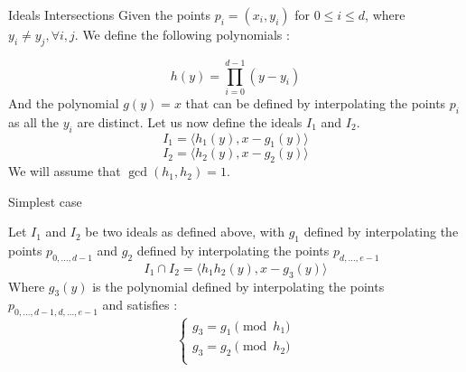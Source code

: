 \documentclass{beamer}
\begin{document}
\begin{frame}{Ideals Intersections}
    Given the points $p_{i} = (x_{i}, y_{i})$ for $0 \leq i \leq d$, where $y_{i} \neq y_{j}, \forall i, j$. 
    We define the following polynomials : 
    
    \begin{displaymath}
        h(y) = \prod_{i=0}^{d-1} (y - y_{i}) 
    \end{displaymath}
    And the polynomial $g(y) = x$ that can be defined by interpolating the points $p_{i}$ as all the $y_{i}$ are distinct.
    Let us now define the ideals $I_{1}$ and $I_{2}$.
    \begin{displaymath}
        I_{1} = \langle h_{1}(y), x - g_{1}(y) \rangle
    \end{displaymath}
    \begin{displaymath}
        I_{2} = \langle h_{2}(y), x - g_{2}(y) \rangle
    \end{displaymath}
    We will assume that $\gcd(h_{1}, h_{2}) = 1$.
\end{frame}

\begin{frame}{Simplest case}
\begin{theorem}
    Let $I_{1}$ and $I_{2}$ be two ideals as defined above, with $g_{1}$ defined by interpolating the points $p_{0,\dots,d-1}$ and $g_{2}$ defined by interpolating the points $p_{d,\dots,e-1}$
    \begin{displaymath}
        I_{1} \cap I_{2} = \langle h_{1}h_{2}(y), x - g_{3}(y) \rangle
    \end{displaymath}
    Where $g_{3}(y)$ is the polynomial defined by interpolating the points $p_{0,\dots,d-1,d,\dots,e-1}$ and satisfies :
    \begin{displaymath}
    \left\{
    \begin{array}{ll}
        g_{3} = g_{1} \pmod {h_{1}} \\
        g_{3} = g_{2} \pmod {h_{2}} \\
    \end{array}
    \right.
    \end{displaymath}
\end{theorem}
\end{frame}
\end{document}

